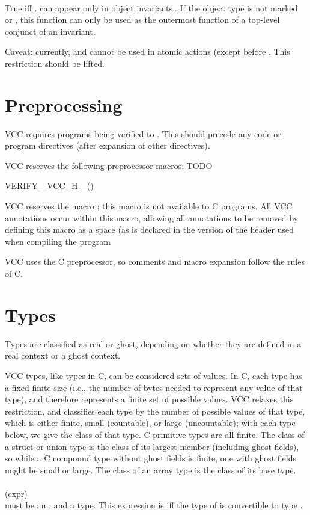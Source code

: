 \documentclass[preprint,nocopyrightspace]{sigplanconf}
\begin{document}
{\noindent{}\\
True iff .
\vcc{\mine} can appear only in object invariants,. 
If the object type is not marked 
or , this function can only be used as the
outermost function of a top-level conjunct of an invariant.

Caveat: currently,  and  cannot be used in atomic
actions (except before . This restriction should
be lifted.

\section{Preprocessing}

VCC requires programs being verified to . This
should precede any code or program directives (after expansion of
other  directives). 
 
VCC reserves the following preprocessor macros: TODO
\begin{VCC}
  VERIFY _VCC_H _() 
\end{VCC}

VCC reserves the macro ; this macro is not available to C
programs. All VCC annotations occur within this macro, allowing all
annotations to be removed by defining this macro as a space (as is
declared in the version of the header  used when
compiling the program


VCC uses the C preprocessor, so comments and macro expansion follow
the rules of C.

\section{Types}
Types are classified as real or ghost, depending on whether they are
defined in a real context or a ghost context.  

VCC types, like types in C, can be considered sets of values. In C,
each type has a fixed finite size (i.e., the number of bytes needed to
represent any value of that type), and therefore represents a finite
set of possible values. VCC relaxes this restriction, and classifies
each type by the number of possible values of that type, which is
either finite, small (countable), or large (uncountable); with each
type below, we give the class of that type. C primitive types are all
finite. The class of a struct or union type is the class of its
largest member (including ghost fields), so while a C compound type
without ghost fields is finite, one with ghost fields might be small
or large. The class of an array type is the class of its base type. 
\\\\
 (expr)\\
 must be an \vcc{\object}, and  a type. 
This expression is \vcc{\true} iff the type of  is convertible to
type .

}
\end{document}
